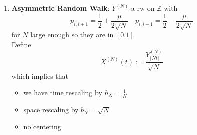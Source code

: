 \documentclass{article}
\begin{document}
\begin{enumerate}
	\item \textbf{Asymmetric Random Walk}:
	$Y^{(N)}$ a rw on $\mathbb{Z}$ with 
	\begin{equation*}
		p_{i, i+1} = \frac{1}{2} + \frac{\mu}{2 \sqrt{N}} \quad p_{i,i-1} = \frac{1}{2} - \frac{\mu}{2\sqrt{N}}
	\end{equation*}
	for $N$ large enough so they are in $[0.1]$.\\
	Define 
	\begin{equation}
		X^{(N)} (t) := \frac{Y_{\lfloor Nt \rfloor}^{(N)}}{\sqrt{N}}
	\end{equation}
	which implies that 
	\begin{itemize}
		\item we have time rescaling by $h_N = \frac{1}{N}$
		\item space rescaling by $b_N=\sqrt{N}$
		\item no centering 
	\end{itemize}
	

\end{enumerate}
\end{document}
